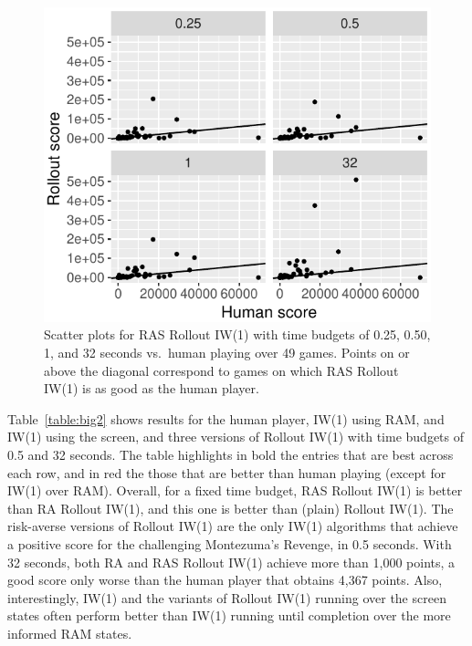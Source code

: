 \documentclass[letterpaper]{article}
\newcommand{\Omit}[1]{}
\newcommand{\CHECK}[1]{\textcolor{red}{\bf *** #1 ***}}
\begin{document}
\begin{figure}[t]
  \centering
  \includegraphics[width=.95\columnwidth]{110-15-halfsec}
  \caption{Scatter plots for RAS Rollout IW(1) with time budgets of 0.25, 0.50, 1, and 32
    seconds vs.\ human playing over 49 games.
    Points on or above the diagonal correspond to games on which RAS Rollout IW(1) is as
    good as the human player.
  }
  \label{fig:110:scatter}
\end{figure}


Table~\ref{table:big2} shows results for the human player, IW(1) using RAM, and
IW(1) using the screen, and three versions of Rollout IW(1) with time budgets
of 0.5 and 32 seconds. The table highlights in bold the entries that are best
across each row, and in red the those that are better than human playing (except
for IW(1) over RAM).
Overall, for a fixed time budget, RAS Rollout IW(1) is better than RA Rollout IW(1),
and this one is better than (plain) Rollout IW(1).
The risk-averse versions of Rollout IW(1) are the only IW(1) algorithms that
achieve a positive score for the challenging Montezuma's Revenge, in 0.5 seconds.
With 32 seconds, both RA and RAS Rollout IW(1) achieve more than 1,000 points,
a good score only worse than the human player that obtains 4,367 points.
Also, interestingly, IW(1) and the variants of Rollout IW(1) running over
the screen states often perform better than IW(1) running until completion over
the more informed RAM states.
\end{document}
